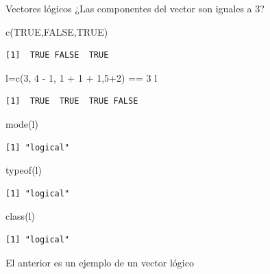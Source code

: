 \documentclass[
  ignorenonframetext,
  aspectratio=169,
  spanish,
]{beamer}
\newenvironment{Shaded}{\begin{snugshade}}{\end{snugshade}}
\newcommand{\ConstantTok}[1]{\textcolor[rgb]{0.56,0.35,0.01}{#1}}
\newcommand{\DecValTok}[1]{\textcolor[rgb]{0.68,0.00,0.00}{#1}}
\newcommand{\FunctionTok}[1]{\textcolor[rgb]{0.28,0.35,0.67}{#1}}
\newcommand{\NormalTok}[1]{\textcolor[rgb]{0.00,0.23,0.31}{#1}}
\newcommand{\OtherTok}[1]{\textcolor[rgb]{0.00,0.23,0.31}{#1}}
\newcommand{\SpecialCharTok}[1]{\textcolor[rgb]{0.37,0.37,0.37}{#1}}
\begin{document}
\begin{frame}[fragile]{Vectores lógicos}
\label{vectores-luxf3gicos}
¿Las componentes del vector son iguales a 3?

\begin{Shaded}
\begin{Highlighting}[]
\FunctionTok{c}\NormalTok{(}\ConstantTok{TRUE}\NormalTok{,}\ConstantTok{FALSE}\NormalTok{,}\ConstantTok{TRUE}\NormalTok{)}
\end{Highlighting}
\end{Shaded}

\begin{verbatim}
[1]  TRUE FALSE  TRUE
\end{verbatim}

\begin{Shaded}
\begin{Highlighting}[]
\NormalTok{l}\OtherTok{=}\FunctionTok{c}\NormalTok{(}\DecValTok{3}\NormalTok{, }\DecValTok{4} \SpecialCharTok{{-}} \DecValTok{1}\NormalTok{, }\DecValTok{1} \SpecialCharTok{+} \DecValTok{1} \SpecialCharTok{+} \DecValTok{1}\NormalTok{,}\DecValTok{5}\SpecialCharTok{+}\DecValTok{2}\NormalTok{) }\SpecialCharTok{==} \DecValTok{3} 
\NormalTok{l}
\end{Highlighting}
\end{Shaded}

\begin{verbatim}
[1]  TRUE  TRUE  TRUE FALSE
\end{verbatim}

\begin{Shaded}
\begin{Highlighting}[]
\FunctionTok{mode}\NormalTok{(l)}
\end{Highlighting}
\end{Shaded}

\begin{verbatim}
[1] "logical"
\end{verbatim}

\begin{Shaded}
\begin{Highlighting}[]
\FunctionTok{typeof}\NormalTok{(l)}
\end{Highlighting}
\end{Shaded}

\begin{verbatim}
[1] "logical"
\end{verbatim}

\begin{Shaded}
\begin{Highlighting}[]
\FunctionTok{class}\NormalTok{(l)}
\end{Highlighting}
\end{Shaded}

\begin{verbatim}
[1] "logical"
\end{verbatim}

El anterior es un ejemplo de un vector lógico
\end{frame}
\end{document}
